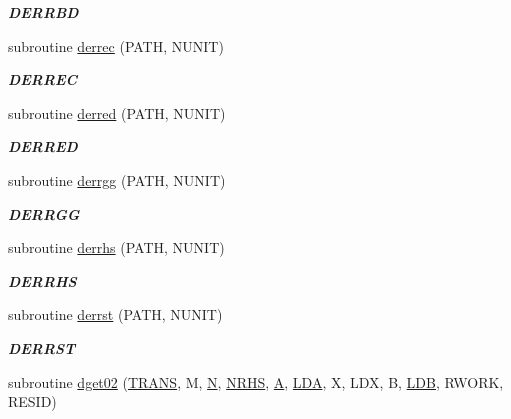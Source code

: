 \begin{DoxyCompactItemize}
\begin{DoxyCompactList}\small\item\em {\bfseries D\+E\+R\+R\+B\+D} \end{DoxyCompactList}\item 
subroutine \hyperlink{group__double__eig_ga5320e38d676febaa986dd34106f0bb2f}{derrec} (P\+A\+T\+H, N\+U\+N\+I\+T)
\begin{DoxyCompactList}\small\item\em {\bfseries D\+E\+R\+R\+E\+C} \end{DoxyCompactList}\item 
subroutine \hyperlink{group__double__eig_gae397fe859a9ec662321082f76fb08b8f}{derred} (P\+A\+T\+H, N\+U\+N\+I\+T)
\begin{DoxyCompactList}\small\item\em {\bfseries D\+E\+R\+R\+E\+D} \end{DoxyCompactList}\item 
subroutine \hyperlink{group__double__eig_gab1d9ace812b32d503ff8f053720136c7}{derrgg} (P\+A\+T\+H, N\+U\+N\+I\+T)
\begin{DoxyCompactList}\small\item\em {\bfseries D\+E\+R\+R\+G\+G} \end{DoxyCompactList}\item 
subroutine \hyperlink{group__double__eig_gab764b80cbc14db00eaf61ea4d9b81b1a}{derrhs} (P\+A\+T\+H, N\+U\+N\+I\+T)
\begin{DoxyCompactList}\small\item\em {\bfseries D\+E\+R\+R\+H\+S} \end{DoxyCompactList}\item 
subroutine \hyperlink{group__double__eig_gae21a3e291e9a00ac64068628a398361f}{derrst} (P\+A\+T\+H, N\+U\+N\+I\+T)
\begin{DoxyCompactList}\small\item\em {\bfseries D\+E\+R\+R\+S\+T} \end{DoxyCompactList}\item 
subroutine \hyperlink{group__double__eig_gaed33a09e8bc0c43d32c67f83e1673630}{dget02} (\hyperlink{superlu__enum__consts_8h_a0c4e17b2d5cea33f9991ccc6a6678d62a1f61e3015bfe0f0c2c3fda4c5a0cdf58}{T\+R\+A\+N\+S}, M, \hyperlink{polmisc_8c_a0240ac851181b84ac374872dc5434ee4}{N}, \hyperlink{example__user_8c_aa0138da002ce2a90360df2f521eb3198}{N\+R\+H\+S}, \hyperlink{classA}{A}, \hyperlink{example__user_8c_ae946da542ce0db94dced19b2ecefd1aa}{L\+D\+A}, X, L\+D\+X, B, \hyperlink{example__user_8c_a50e90a7104df172b5a89a06c47fcca04}{L\+D\+B}, R\+W\+O\+R\+K, R\+E\+S\+I\+D)

\end{DoxyCompactItemize}
